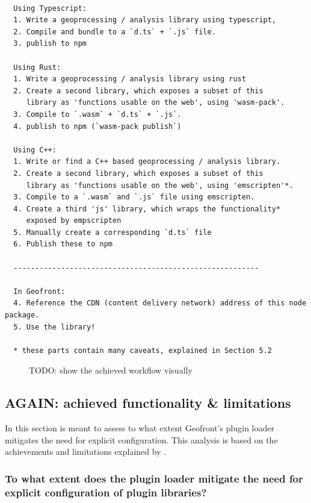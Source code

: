 \begin{lstlisting}
  
  Using Typescript: 
  1. Write a geoprocessing / analysis library using typescript, 
  2. Compile and bundle to a `d.ts` + `.js` file.
  3. publish to npm 

  Using Rust: 
  1. Write a geoprocessing / analysis library using rust
  2. Create a second library, which exposes a subset of this 
     library as 'functions usable on the web', using 'wasm-pack'.
  3. Compile to `.wasm` + `d.ts` + `.js`.
  4. publish to npm (`wasm-pack publish`)
  
  Using C++: 
  1. Write or find a C++ based geoprocessing / analysis library. 
  2. Create a second library, which exposes a subset of this 
     library as 'functions usable on the web', using 'emscripten'*.
  3. Compile to a `.wasm` and `.js` file using emscripten.
  4. Create a third 'js' library, which wraps the functionality* 
     exposed by empscripten
  5. Manually create a corresponding `d.ts` file
  6. Publish these to npm 

  ---------------------------------------------------------

  In Geofront: 
  4. Reference the CDN (content delivery network) address of this node package. 
  5. Use the library!

  * these parts contain many caveats, explained in Section 5.2

\end{lstlisting}

\begin{figure}
  \centering
  \graphicspath{ {../../assets/diagrams/} }
  \caption[]{TODO: show the achieved workflow visually}
  \label{fig:todo-more-images}
\end{figure}

\subsection{AGAIN: achieved functionality \& limitations}
\label{sec:analyses:loading}

In this section is meant to assess to what extent Geofront's plugin loader mitigates the need for explicit configuration.
This analysis is based on the achievements and limitations explained by .

\subsubsection*{To what extent does the plugin loader mitigate the need for explicit configuration of plugin libraries?}

